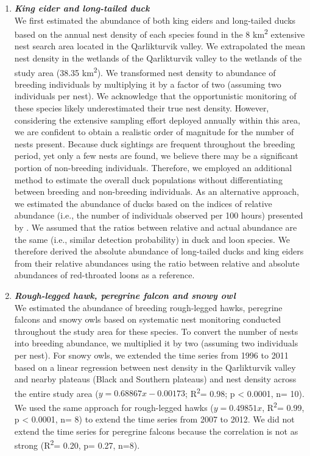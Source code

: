 \documentclass[a4paper,twoside,12pt]{article}
\begin{document}
\begin{enumerate}[label=\alph*.]
                \item[] \textit{\textbf{King eider and long-tailed duck}}\\
                We first estimated the abundance of both king eiders and long-tailed ducks based on the annual nest density of each species found in the 8 km\textsuperscript{2} extensive nest search area located in the Qarlikturvik valley. We extrapolated the mean nest density in the wetlands of the Qarlikturvik valley to the wetlands of the study area (38.35 km\textsuperscript{2}). We transformed nest density to abundance of breeding individuals by multiplying it by a factor of two (assuming two individuals per nest). We acknowledge that the opportunistic monitoring of these species likely underestimated their true nest density. However, considering the extensive sampling effort deployed annually within this area, we are confident to obtain a realistic order of magnitude for the number of nests present. Because duck sightings are frequent throughout the breeding period, yet only a few nests are found, we believe there may be a significant portion of non-breeding individuals. Therefore, we employed an additional method to estimate the overall duck populations without differentiating between breeding and non-breeding individuals. 
As an alternative approach, we estimated the abundance of ducks based on the indices of relative abundance (i.e., the number of individuals observed per 100 hours) presented by \citet{gauthier2024a}. We assumed that the ratios between relative and actual abundance are the same (i.e., similar detection probability) in duck and loon species. We therefore derived the absolute abundance of long-tailed ducks and king eiders from their relative abundances using the ratio between relative and absolute abundances of red-throated loons as a reference.
                                
                                
                \item[] \textit{\textbf{Rough-legged hawk, peregrine falcon and snowy owl}} \\
                We estimated the abundance of breeding rough-legged hawks, peregrine falcons and snowy owls based on systematic nest monitoring conducted throughout the study area for these species. To convert the number of nests into breeding abundance, we multiplied it by two (assuming two individuals per nest). For snowy owls, we extended the time series from 1996 to 2011 based on a linear regression between nest density in the Qarlikturvik valley and nearby plateaus (Black and Southern plateaus) and nest density across the entire study area ($y= 0.68867x -0.00173$; R\textsuperscript{2}= 0.98; p < 0.0001, n= 10). We used the same approach for rough-legged hawks ($y=0.49851x$, R\textsuperscript{2}= 0.99, p < 0.0001, n= 8) to extend the time series from 2007 to 2012. We did not extend the time series for peregrine falcons because the correlation is not as strong (R\textsuperscript{2}= 0.20, p= 0.27, n=8).
                

\end{enumerate}
\end{document}
